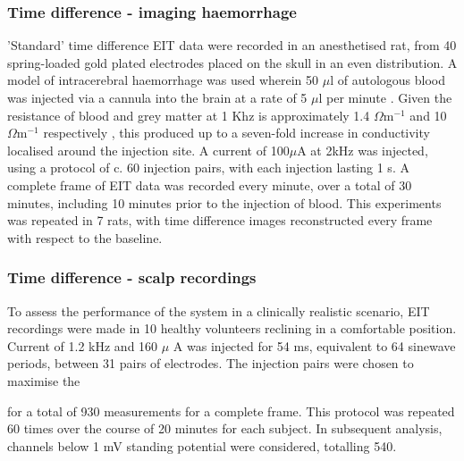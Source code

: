 \subsubsection{Time difference - imaging haemorrhage}
\label{methodsTD}
'Standard' time difference EIT data were recorded in an anesthetised rat, from 40 spring-loaded gold plated electrodes placed on the skull in an even distribution. A model of intracerebral haemorrhage was used wherein 50 $\mu$l of autologous blood was injected via a cannula into the brain at a rate of 5 $\mu$l per minute \cite{Dowrick_2016}. Given the resistance of blood and grey matter at 1 Khz is approximately 1.4 $\Omega {\text{m}}^{-1}$ and 10 $\Omega {\text{m}}^{-1}$ respectively \cite{Gabriel_2009}, this produced up to a seven-fold increase in conductivity localised around the injection site. A current of 100\( \mu \)A at 2kHz was injected, using a protocol of c. 60 injection pairs, with each injection lasting 1 s. A complete frame of EIT data was recorded every minute, over a total of 30 minutes, including 10 minutes prior to the injection of blood. This experiments was repeated in 7 rats, with time difference images reconstructed every frame with respect to the baseline.

\subsubsection{Time difference - scalp recordings}

To assess the performance of the system in a clinically realistic scenario, EIT recordings were made in 10 healthy volunteers reclining in a comfortable position. Current of 1.2 kHz and 160 $\mu$ A was injected for 54 ms, equivalent to 64 sinewave periods, between 31 pairs of electrodes. The injection pairs were chosen to maximise the  \cite{Malone2014a}


for a total of 930 measurements for a complete frame. This protocol was repeated 60 times over the course of 20 minutes for each subject. In subsequent analysis, channels below 1 mV standing potential were considered, totalling 540. 